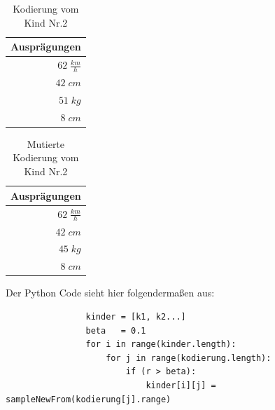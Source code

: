             \begin{multicols}{2}
                \begin{table}[H]
                    \begin{center}
                    \begin{tabular}{ |r| } 
                        \hline
                        \hfill Ausprägungen  \\ \hline
                        \cellcolor{yellow!25} $ 62\; \frac{km}{h}$ \\ \hline
                        \cellcolor{blue!25}   $ 42\; cm          $ \\ \hline
                        \cellcolor{blue!25}   $ 51\; kg          $ \\ \hline
                        \cellcolor{yellow!25} $  8\; cm          $ \\ \hline
                    \end{tabular}
                    \end{center}
                    \caption{Kodierung vom Kind Nr.2 \label{fig:somelabel}}
                \end{table}

                \begin{table}[H]
                    \begin{center}
                    \begin{tabular}{ |r| } 
                        \hline
                        \hfill Ausprägungen  \\ \hline
                        \cellcolor{yellow!25} $ 62\; \frac{km}{h}$ \\ \hline
                        \cellcolor{blue!25}   $ 42\; cm          $ \\ \hline
                        \cellcolor{red!25}    $ 45\; kg          $ \\ \hline
                        \cellcolor{yellow!25} $  8\; cm          $ \\ \hline
                    \end{tabular}
                    \end{center}
                    \caption{Mutierte Kodierung vom Kind Nr.2 \label{fig:somelabel}}
                \end{table}
            \end{multicols}
\newpage
            Der Python Code sieht hier folgendermaßen aus:
            \begin{mdframed}
            \begin{verbatim}
                kinder = [k1, k2...]
                beta   = 0.1
                for i in range(kinder.length):
                    for j in range(kodierung.length):
                        if (r > beta):
                            kinder[i][j] = sampleNewFrom(kodierung[j].range)
            \end{verbatim}
            \end{mdframed}
